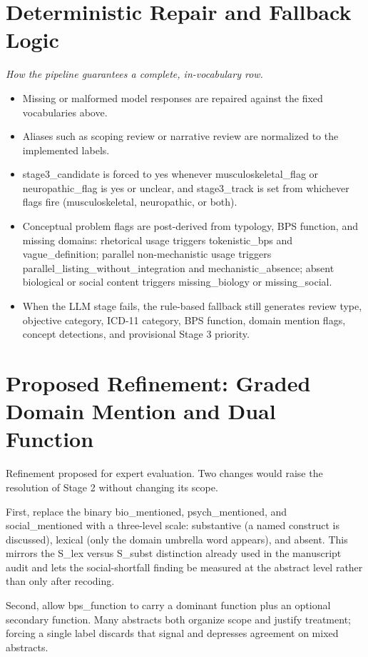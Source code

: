 \documentclass[11pt]{article}
\begin{document}
\section*{Deterministic Repair and Fallback Logic}
{\small\itshape How the pipeline guarantees a complete, in-vocabulary row.}\par\smallskip
\begin{itemize}
\item Missing or malformed model responses are repaired against the fixed vocabularies above.
\item Aliases such as scoping review or narrative review are normalized to the implemented labels.
\item stage3\_candidate is forced to yes whenever musculoskeletal\_flag or neuropathic\_flag is yes or unclear, and stage3\_track is set from whichever flags fire (musculoskeletal, neuropathic, or both).
\item Conceptual problem flags are post-derived from typology, BPS function, and missing domains: rhetorical usage triggers tokenistic\_bps and vague\_definition; parallel non-mechanistic usage triggers parallel\_listing\_without\_integration and mechanistic\_absence; absent biological or social content triggers missing\_biology or missing\_social.
\item When the LLM stage fails, the rule-based fallback still generates review type, objective category, ICD-11 category, BPS function, domain mention flags, concept detections, and provisional Stage 3 priority.
\end{itemize}

\section*{Proposed Refinement: Graded Domain Mention and Dual Function}
Refinement proposed for expert evaluation. Two changes would raise the resolution of Stage 2 without changing its scope.

First, replace the binary bio\_mentioned, psych\_mentioned, and social\_mentioned with a three-level scale: substantive (a named construct is discussed), lexical (only the domain umbrella word appears), and absent. This mirrors the S\_lex versus S\_subst distinction already used in the manuscript audit and lets the social-shortfall finding be measured at the abstract level rather than only after recoding.

Second, allow bps\_function to carry a dominant function plus an optional secondary function. Many abstracts both organize scope and justify treatment; forcing a single label discards that signal and depresses agreement on mixed abstracts.
\end{document}
